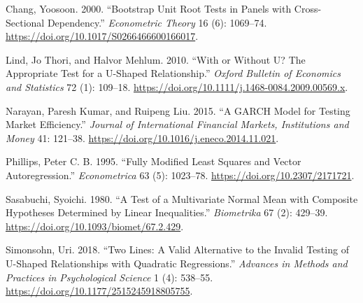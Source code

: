 \protect{}\label{refs}
\begin{CSLReferences}{1}{1}
Chang, Yoosoon. 2000. {``Bootstrap Unit Root Tests in Panels with
Cross-Sectional Dependency.''} \emph{Econometric Theory} 16 (6):
1069--74. \url{https://doi.org/10.1017/S0266466600166017}.

Lind, Jo Thori, and Halvor Mehlum. 2010. {``With or Without {U}? The
Appropriate Test for a {U}-Shaped Relationship.''} \emph{Oxford Bulletin
of Economics and Statistics} 72 (1): 109--18.
\url{https://doi.org/10.1111/j.1468-0084.2009.00569.x}.

Narayan, Paresh Kumar, and Ruipeng Liu. 2015. {``A {GARCH} Model for
Testing Market Efficiency.''} \emph{Journal of International Financial
Markets, Institutions and Money} 41: 121--38.
\url{https://doi.org/10.1016/j.eneco.2014.11.021}.

Phillips, Peter C. B. 1995. {``Fully Modified Least Squares and Vector
Autoregression.''} \emph{Econometrica} 63 (5): 1023--78.
\url{https://doi.org/10.2307/2171721}.

Sasabuchi, Syoichi. 1980. {``A Test of a Multivariate Normal Mean with
Composite Hypotheses Determined by Linear Inequalities.''}
\emph{Biometrika} 67 (2): 429--39.
\url{https://doi.org/10.1093/biomet/67.2.429}.

Simonsohn, Uri. 2018. {``Two Lines: A Valid Alternative to the Invalid
Testing of {U}-Shaped Relationships with Quadratic Regressions.''}
\emph{Advances in Methods and Practices in Psychological Science} 1 (4):
538--55. \url{https://doi.org/10.1177/2515245918805755}.

\end{CSLReferences}
